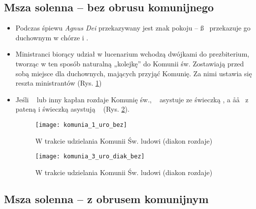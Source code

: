 \clearpage

\subsection{Msza solenna -- bez obrusu komunijnego}

\begin{itemize}
	\item Podczas śpiewu \textit{Agnus Dei} przekazywany jest znak pokoju – \ss~
	      przekazuje go duchownym w chórze i \cc\cc.
	\item Ministranci biorący udział w lucenarium wchodzą dwójkami do
	      prezbiterium, tworząc w ten sposób naturalną „kolejkę” do Komunii św.
	      Zostawiają przed sobą miejsce dla duchownych, mających przyjąć
	      Komunię. Za nimi ustawia się reszta ministrantów (Rys.
	      \ref{fig:komunia_1_uro_bez})
	\item Jeśli \dd~ lub inny kapłan rozdaje Komunię św., \cc~ asystuje ze
	      świeczką \ii, a \aa\aa~ z pateną i świeczką asystują \dd~ (Rys.
	      \ref{fig:komunia_3_uro_diak_bez}).

	      \begin{figure}[ht]
		      \centering
		      \texttt{[image: komunia\_1\_uro\_bez]}
		      \caption{W trakcie udzielania Komunii Św. ludowi (diakon rozdaje)}
		      \label{fig:komunia_1_uro_bez}
	      \end{figure}

	      \begin{figure}[ht]
		      \centering
		      \texttt{[image: komunia\_3\_uro\_diak\_bez]}
		      \caption{W trakcie udzielania Komunii Św. ludowi (diakon rozdaje)}
		      \label{fig:komunia_3_uro_diak_bez}
	      \end{figure}
\end{itemize}

\subsection{Msza solenna -- z obrusem komunijnym}

